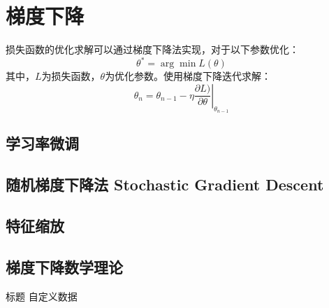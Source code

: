 \section{梯度下降}
损失函数的优化求解可以通过梯度下降法实现，对于以下参数优化：
\begin{equation}
\theta^* = \arg \min L(\theta)
\end{equation}
其中，$L$为损失函数，$\theta$为优化参数。使用梯度下降迭代求解：
\begin{equation}
	\theta_n = \theta_{n-1} - \left. \eta \frac{\partial L)}{\partial \theta}\right|_{\theta_{n-1}}
\end{equation}

\subsection{学习率微调}


\subsection{随机梯度下降法 Stochastic Gradient Descent}

\subsection{特征缩放}

\subsection{梯度下降数学理论}

\begin{myquotation}{标题}
	自定义数据
\end{myquotation}


